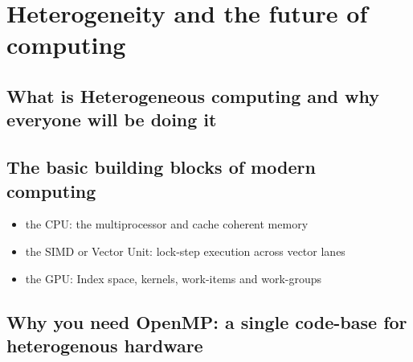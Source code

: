 
\chapter{Heterogeneity and the future of computing}

\section{What is Heterogeneous computing and why everyone will be doing it}

\section{The basic building blocks of modern computing}
\begin{itemize}
\item  the CPU: the multiprocessor and cache coherent memory
\item  the SIMD or Vector Unit: lock-step execution across vector lanes
\item  the GPU:  Index space, kernels, work-items and work-groups
\end{itemize}

\section{Why you need OpenMP: a single code-base for heterogenous hardware}



